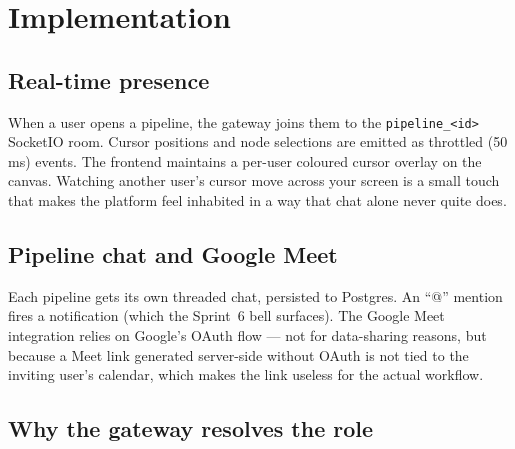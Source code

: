 \documentclass[12pt, a4paper, oneside]{report}
\begin{document}

\section{Implementation}

\subsection{Real-time presence}

When a user opens a pipeline, the gateway joins them to the
\texttt{pipeline\_<id>} SocketIO room. Cursor positions and node
selections are emitted as throttled (50\,ms) events. The frontend
maintains a per-user coloured cursor overlay on the canvas. Watching
another user's cursor move across your screen is a small touch that
makes the platform feel inhabited in a way that chat alone never
quite does.


\subsection{Pipeline chat and Google Meet}

Each pipeline gets its own threaded chat, persisted to Postgres.
An ``@'' mention fires a notification (which the Sprint~6 bell
surfaces). The Google Meet integration relies on Google's OAuth flow
--- not for data-sharing reasons, but because a Meet link generated
server-side without OAuth is not tied to the inviting user's
calendar, which makes the link useless for the actual workflow.

\subsection{Why the gateway resolves the role}
\end{document}
